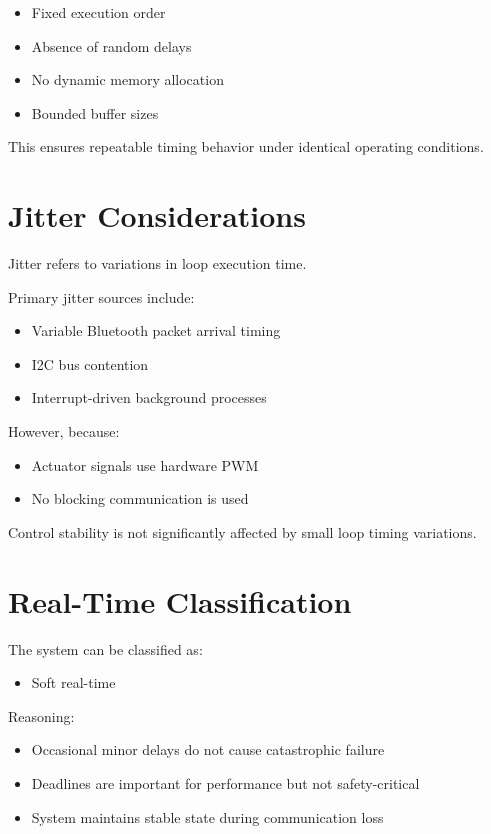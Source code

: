 \begin{itemize}
	\item Fixed execution order
	\item Absence of random delays
	\item No dynamic memory allocation
	\item Bounded buffer sizes
\end{itemize}

This ensures repeatable timing behavior under identical operating conditions.


\section{Jitter Considerations}

Jitter refers to variations in loop execution time.

Primary jitter sources include:

\begin{itemize}
	\item Variable Bluetooth packet arrival timing
	\item I2C bus contention
	\item Interrupt-driven background processes
\end{itemize}

However, because:

\begin{itemize}
	\item Actuator signals use hardware PWM
	\item No blocking communication is used
\end{itemize}

Control stability is not significantly affected by small loop timing variations.


\section{Real-Time Classification}

The system can be classified as:

\begin{itemize}
	\item Soft real-time
\end{itemize}

Reasoning:

\begin{itemize}
	\item Occasional minor delays do not cause catastrophic failure
	\item Deadlines are important for performance but not safety-critical
	\item System maintains stable state during communication loss
\end{itemize}

